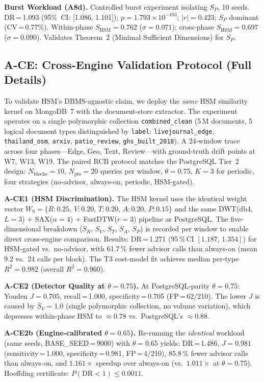 \documentclass[10pt,twocolumn,a4paper]{article}
\newcommand{\SHSM}{S_{\mathrm{HSM}}}
\newcommand{\SR}{S_{R}}
\newcommand{\SV}{S_{V}}
\newcommand{\ST}{S_{T}}
\newcommand{\SA}{S_{A}}
\newcommand{\SPER}{S_{P}}
\newcommand{\Npts}{N_{\mathrm{pts}}}
\begin{document}
\textbf{Burst Workload (A8d).} Controlled burst experiment
isolating $\SPER$, 10 seeds.
DR\,=\,1.093 (95\%~CI: [1.086, 1.101]); $p\!=\!1.793\times10^{-103}$;
$|r|\!=\!0.423$; $\SPER$ dominant (CV\,=\,0.77\%).
Within-phase $\SHSM\!=\!0.762$ ($\sigma\!=\!0.071$);
cross-phase $\SHSM\!=\!0.697$ ($\sigma\!=\!0.090$).
Validates Theorem~2 (Minimal Sufficient
Dimensions) for $\SPER$.

\subsection{A-CE: Cross-Engine Validation Protocol (Full Details)}

To validate HSM's DBMS-agnostic claim,
we deploy the \emph{same} HSM similarity kernel on MongoDB~7 with the
document-store extractor. The experiment operates on a single
polymorphic collection \texttt{combined\_clean} (5\,M documents,
5 logical document types distinguished by \texttt{label}:
\texttt{livejournal\_edge}, \texttt{thailand\_osm}, \texttt{arxiv},
\texttt{patio\_review}, \texttt{ghs\_built\_2018}).
A 24-window trace across four phases---Edge, Geo, Text, Review---with
ground-truth drift points at W7, W13, W19.
The paired RCB protocol matches the PostgreSQL Tier~2 design:
$N_{\mathrm{blocks}}\!=\!10$, $\Npts\!=\!20$ queries per window,
$\theta\!=\!0.75$, $K\!=\!3$ for periodic, four strategies
(no-advisor, always-on, periodic, HSM-gated).

\textbf{A-CE1 (HSM Discrimination).}
The HSM kernel uses the identical weight vector
$W_0\!=\!\{R\!:\!0.25,\,V\!:\!0.20,\,T\!:\!0.20,\,A\!:\!0.20,\,P\!:\!0.15\}$
and the same DWT(db4, $L\!=\!3$) + SAX($\alpha\!=\!4$) +
FastDTW($r\!=\!3$) pipeline as PostgreSQL. The five-dimensional
breakdown ($\SR$, $\SV$, $\ST$, $\SA$, $\SPER$) is recorded per
window to enable direct cross-engine comparison.
Results: DR\,=\,1.271 (95\,\%\,CI $[1.187,\,1.354]$) for HSM-gated
vs.\ no-advisor, with 61.7\,\% fewer advisor calls than always-on
(mean 9.2 vs.\ 24 calls per block).
The T3 cost-model fit achieves median per-type
$R^2\!=\!0.982$ (overall $R^2\!=\!0.960$).

\textbf{A-CE2 (Detector Quality at $\theta\!=\!0.75$).}
At PostgreSQL-parity $\theta\!=\!0.75$: Youden $J\!=\!0.705$,
recall\,=\,1.000, specificity\,=\,0.705 (FP\,=\,62/210).
The lower $J$ is caused by $\bar{S}_V\!=\!1.0$ (single polymorphic
collection, no volume variation), which depresses within-phase HSM
to $\approx\!0.78$ vs.\ PostgreSQL's $\approx\!0.88$.

\textbf{A-CE2b (Engine-calibrated $\theta\!=\!0.65$).}
Re-running the \emph{identical} workload (same seeds, BASE\_SEED\,=\,9000)
with $\theta\!=\!0.65$ yields:
DR\,=\,1.486, $J\!=\!0.981$ (sensitivity\,=\,1.000, specificity\,=\,0.981,
FP\,=\,4/210), 85.8\,\% fewer advisor calls than always-on,
and $1.161\times$ speedup over always-on (vs.\ $1.011\times$ at
$\theta\!=\!0.75$).
Hoeffding certificate: $P(\text{DR}<1)\!\le\!0.0011$.
\end{document}
